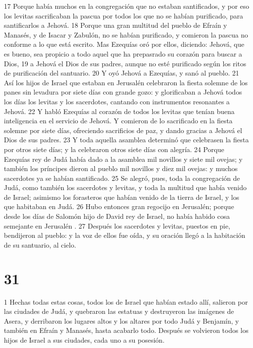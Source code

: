17 Porque había muchos en la congregación que no estaban santificados, y por eso los levitas sacrificaban la pascua por todos los que no se habían purificado, para santificarlos a Jehová.
18 Porque una gran multitud del pueblo de Efraín y Manasés, y de Isacar y Zabulón, no se habían purificado, y comieron la pascua no conforme a lo que está escrito. Mas Ezequías oró por ellos, diciendo: Jehová, que es bueno, sea propicio a todo aquel que ha prepasrado su corazón para buscar a Dios,
19 a Jehová el Dios de sus padres, aunque no esté purificado según los ritos de  purificación del santuario.
20 Y oyó Jehová a Ezequías, y sanó al pueblo.
21 Así los hijos de Israel que estaban en Jerusalén celebraron la fiesta solemne de los panes sin levadura por siete días con grande gozo: y glorificaban a Jehová todos los días los levitas y los sacerdotes, cantando con instrumentos resonantes a Jehová.
22 Y habló Ezequías al corazón de todos los levitas que tenían buena inteligencia en el servicio de Jehová. Y comieron de lo sacrificado en la fiesta solemne por siete días, ofreciendo sacrificios de paz, y dando gracias a Jehová el Dios de sus padres.
23 Y toda aquella asamblea determinó que celebrasen la fiesta por otros siete días; y la celebraron otros siete días con alegría.
24 Porque Ezequías rey de Judá había dado a la asamblea mil novillos y siete mil ovejas; y también los príncipes dieron al pueblo mil novillos y diez mil ovejas: y muchos sacerdotes ya se habían santificado.
25 Se alegró, pues, toda la congregación de Judá, como también los sacerdotes y levitas, y toda la multitud que había venido de Israel; asimismo los forasteros que habían venido de la tierra de Israel, y los que habitaban en Judá.
26 Hubo entonces gran regocijo en Jerusalén; porque desde los días de Salomón hijo de David rey de Israel, no había habido cosa semejante en Jerusalén .
27 Después los sacerdotes y levitas, puestos en pie, bendijeron al pueblo: y la voz de ellos fue oída, y su oración llegó a la habitación de su santuario, al cielo.

\chapter{31}

1 Hechas todas estas cosas, todos los de Israel que habían estado allí, salieron por las ciudades de Judá, y quebraron las estatuas y destruyeron las imágenes de Asera, y derribaron los lugares altos y los altares por todo Judá y Benjamín, y también en Efraín y Manasés, hasta acabarlo todo. Después se volvieron todos los hijos de Israel a sus ciudades, cada uno a su posesión.

